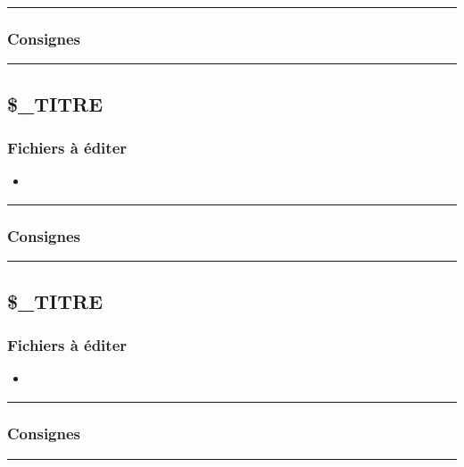 \documentclass[a4paper,10pt]{article}
\begin{document}

\color{blue}\par\noindent\rule{\textwidth}{0.4pt}\color{white}

\color{blue}
\subsubsection{Consignes}\color{white}



\color{green}\par\noindent\rule{\textwidth}{0.4pt}\color{white}

\color{green}
\subsection{\$\_TITRE}\color{white}

\color{blue}
\subsubsection{Fichiers à éditer}\color{white}
\begin{itemize}
    \item \textbf{\color{lime}\color{white}}
\end{itemize}



\color{blue}\par\noindent\rule{\textwidth}{0.4pt}\color{white}

\color{blue}
\subsubsection{Consignes}\color{white}



\color{green}\par\noindent\rule{\textwidth}{0.4pt}\color{white}

\color{green}
\subsection{\$\_TITRE}\color{white}

\color{blue}
\subsubsection{Fichiers à éditer}\color{white}
\begin{itemize}
    \item \textbf{\color{lime}\color{white}}
\end{itemize}



\color{blue}\par\noindent\rule{\textwidth}{0.4pt}\color{white}

\color{blue}
\subsubsection{Consignes}\color{white}



\color{green}\par\noindent\rule{\textwidth}{0.4pt}\color{white}
\end{document}
